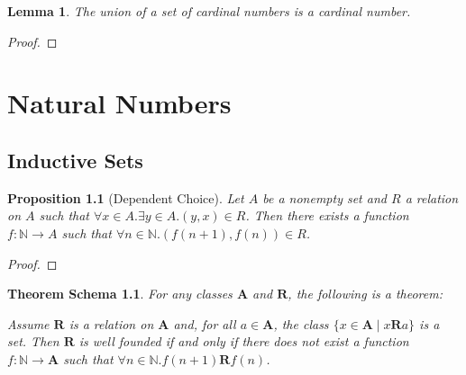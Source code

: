 \documentclass{book}
\let\qed\relax
\newtheorem{prop}[ax]{Proposition}
\newtheorem{thms}[ax]{Theorem Schema}
\newtheorem{lm}[ax]{Lemma}
\theoremstyle{definition}
\begin{document}
\begin{lm}
\label{lm:supcard}
The union of a set of cardinal numbers is a cardinal number.
\end{lm}

\begin{proof}
\pf
{}
\qed
\end{proof}

\chapter{Natural Numbers}

\section{Inductive Sets}

\begin{prop}[Dependent Choice]
Let $A$ be a nonempty set and $R$ a relation on $A$ such that $\forall x \in A. \exists y \in A. (y,x) \in R$. Then there exists a function $f : \mathbb{N} \rightarrow A$ such that $\forall n \in \mathbb{N}. (f(n+1),f(n)) \in R$.
\end{prop}

\begin{proof}
\pf
{}
\qed
\end{proof}

\begin{thms}
For any classes $\mathbf{A}$ and $\mathbf{R}$, the following is a theorem:


Assume $\mathbf{R}$ is a relation on $\mathbf{A}$ and, for all $a \in \mathbf{A}$, the class $\{ x \in \mathbf{A} \mid x \mathbf{R} a \}$ is a set. Then $\mathbf{R}$ is well founded if and only if there does not exist a function $f : \mathbb{N} \rightarrow \mathbf{A}$ such that $\forall n \in \mathbb{N}. f(n+1) \mathbf{R} f(n)$.
\end{thms}
\end{document}
